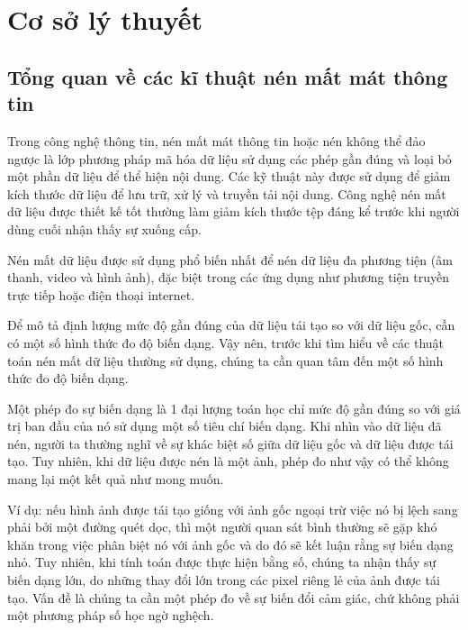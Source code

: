 \chapter{Cơ sở lý thuyết}
\label{cha: chap2}

\section{Tổng quan về các kĩ thuật nén mất mát thông tin}
Trong công nghệ thông tin, nén mất mát thông tin hoặc nén không thể đảo
ngược là lớp phương pháp mã hóa dữ liệu sử dụng các phép gần đúng
và loại bỏ một phần dữ liệu để thể hiện nội dung. Các kỹ thuật này
được sử dụng để giảm kích thước dữ liệu để lưu trữ, xử lý và truyền
tải nội dung. Công nghệ nén mất dữ liệu được thiết kế tốt thường
làm giảm kích thước tệp đáng kể trước khi người dùng cuối nhận
thấy sự xuống cấp.

Nén mất dữ liệu được sử dụng phổ biến nhất để nén dữ liệu
đa phương tiện (âm thanh, video và hình ảnh), đặc biệt trong
các ứng dụng như phương tiện truyền trực tiếp hoặc điện thoại internet.

Để mô tả định lượng mức độ gần đúng của dữ liệu tái tạo so
với dữ liệu gốc, cần có một số hình thức đo độ biến dạng.
Vậy nên, trước khi tìm hiểu về các thuật toán nén mất dữ
liệu thường sử dụng, chúng ta cần quan tâm đến một số hình
thức đo độ biến dạng.

Một phép đo sự biến dạng là 1 đại lượng toán học chỉ mức
độ gần đúng so với giá trị ban đầu của nó sử dụng một số
tiêu chí biến dạng. Khi nhìn vào dữ liệu đã nén, người ta
thường nghĩ về sự khác biệt số giữa dữ liệu gốc và dữ liệu
được tái tạo. Tuy nhiên, khi dữ liệu được nén là một ảnh,
phép đo như vậy có thể không mang lại một kết quả như mong muốn.

Ví dụ: nếu hình ảnh được tái tạo giống với ảnh gốc ngoại
trừ việc nó bị lệch sang phải bởi một đường quét dọc, thì
một người quan sát bình thường sẽ gặp khó khăn trong việc
phân biệt nó với ảnh gốc và do đó sẽ kết luận rằng sự biến
dạng nhỏ. Tuy nhiên, khi tính toán được thực hiện bằng số,
chúng ta nhận thấy sự biến dạng lớn, do những thay đổi lớn
trong các pixel riêng lẻ của ảnh được tái tạo. Vấn đề là
chúng ta cần một phép đo về sự biến đổi cảm giác, chứ không
phải một phương pháp số học ngờ nghệch.

